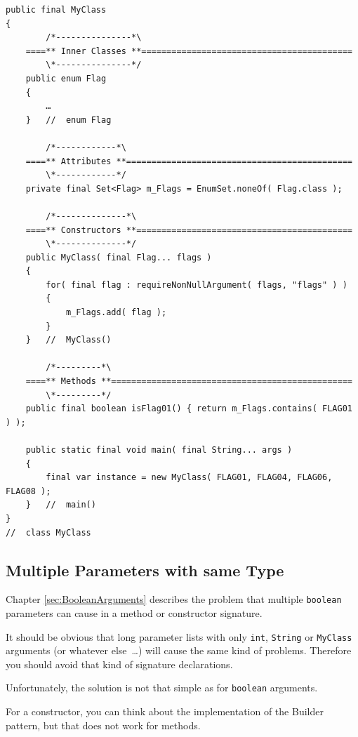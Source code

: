 \documentclass[11pt,a4paper, titlepage, parskip=half, headsepline, footsepline, cleardoublepage=current, headheight=1cm]{scrbook}
\newcommand*{\tqref}[1]{\hyperref[{#1}]{\ref*{#1}}}
\begin{document}
\begin{lstlisting}
public final MyClass
{
        /*---------------*\
    ====** Inner Classes **==========================================
        \*---------------*/
    public enum Flag
    {
        …
    }   //  enum Flag    
   
        /*------------*\
    ====** Attributes **=============================================    
        \*------------*/
    private final Set<Flag> m_Flags = EnumSet.noneOf( Flag.class );
    
        /*--------------*\
    ====** Constructors **===========================================
        \*--------------*/
    public MyClass( final Flag... flags )
    {
        for( final flag : requireNonNullArgument( flags, "flags" ) )
        {
            m_Flags.add( flag );
        }
    }   //  MyClass()
    
        /*---------*\
    ====** Methods **================================================
        \*---------*/
    public final boolean isFlag01() { return m_Flags.contains( FLAG01 ) );
        
    public static final void main( final String... args )
    {
        final var instance = new MyClass( FLAG01, FLAG04, FLAG06, FLAG08 );
    }   //  main()
}
//  class MyClass
\end{lstlisting}


\subsection{Multiple Parameters with same Type}\label{sec:MultipleSameTypeArgs}
Chapter \tqref{sec:BooleanArguments} describes the problem that multiple \lstinline|boolean| parameters can cause in a method or constructor signature.

It should be obvious that long parameter lists with only \lstinline|int|, \lstinline|String| or \lstinline|MyClass| arguments (or whatever else~…) will cause the same kind of problems. Therefore you should avoid that kind of signature declarations.

Unfortunately, the solution is not that simple as for \lstinline|boolean| arguments.

For a constructor, you can think about the implementation of the Builder pattern\autocite{Gamma:DesignPatterns}, but that does not work for methods.
\end{document}
